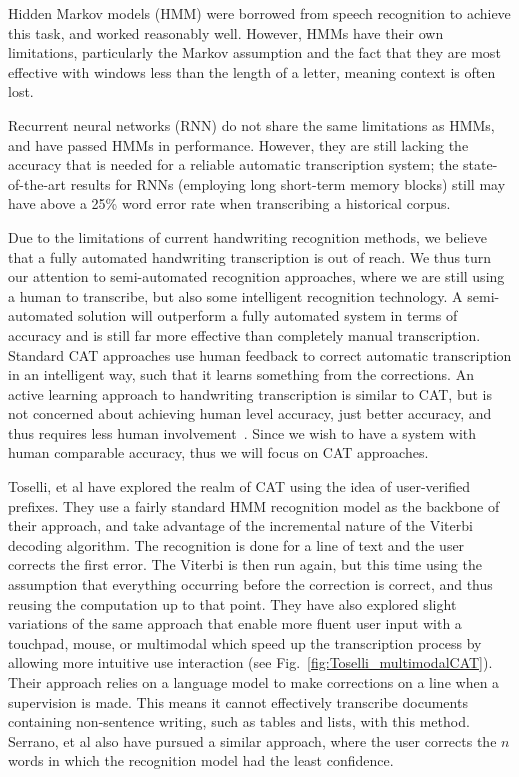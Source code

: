 \documentclass[ms]{byuprop}
\begin{document}
Hidden Markov models (HMM) were borrowed from speech recognition to achieve this task, and worked reasonably well\cite{Marti2001}. However, HMMs have their own limitations, particularly the Markov assumption and the fact that they are most effective with windows less than the length of a letter, meaning context is often lost.

Recurrent neural networks (RNN) do not share the same limitations as HMMs, and have passed HMMs in performance\cite{Graves2009hmm}. However, they are still lacking the accuracy that is needed for a reliable automatic transcription system; the state-of-the-art results for RNNs (employing long short-term memory blocks) still may have above a 25\% word error rate when transcribing a historical corpus\cite{icdarComp2015}.



Due to the limitations of current handwriting recognition methods, we believe that a fully automated handwriting transcription is out of reach. We thus turn our attention to semi-automated recognition approaches, where we are still using a human to transcribe, but also some intelligent recognition technology. A semi-automated solution will outperform a fully automated system in terms of accuracy and is still far more effective than completely manual transcription. Standard CAT approaches use human feedback to correct automatic transcription in an intelligent way, such that it learns something from the corrections. An active learning approach to handwriting transcription is similar to CAT, but is not concerned about achieving human level accuracy, just better accuracy, and thus requires less human involvement~\cite{Serrano2010}. Since we wish to have a system with human comparable accuracy, thus we will focus on CAT approaches.

Toselli, et al\cite{Toselli2007} have explored the realm of CAT using the idea of user-verified prefixes. They use a fairly standard HMM recognition model as the backbone of their approach, and take advantage of the incremental nature of the Viterbi decoding algorithm. The recognition is done for a line of text and the user corrects the first error. The Viterbi is then run again, but this time using the assumption that everything occurring before the correction is correct, and thus reusing the computation up to that point. They have also explored slight variations of the same approach that enable more fluent user input with a touchpad\cite{Toselli2008}, mouse\cite{Toselli2009}, or multimodal\cite{Toselli2010} which speed up the transcription process by allowing more intuitive use interaction (see Fig.~\ref{fig:Toselli_multimodalCAT}). Their approach relies on a language model to make corrections on a line when a supervision is made. This means it cannot effectively transcribe documents containing non-sentence writing, such as tables and lists, with this method. Serrano, et al also have pursued a similar approach, where the user corrects the $n$ words in which the recognition model had the least confidence\cite{Serrano2014}.
\end{document}
